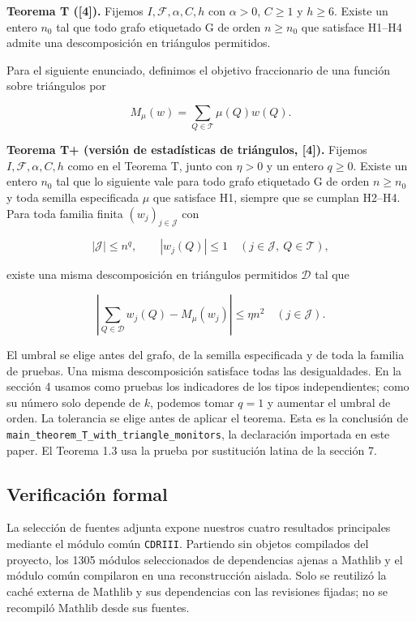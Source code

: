 \documentclass[spanish,11pt,a4paper]{article}
\begin{document}
\textbf{Teorema T ({[}4{]}).} Fijemos \(I,\mathcal F,\alpha,C,h\) con \(\alpha>0\), \(C\geq1\) y \(h\geq6\). Existe un entero \(n_0\) tal que todo grafo etiquetado G de orden \(n\geq n_0\) que satisface H1--H4 admite una descomposición en triángulos permitidos.

Para el siguiente enunciado, definimos el objetivo fraccionario de una función sobre triángulos por

\[M_\mu(w)=\sum_{Q\in\mathcal T}\mu(Q)w(Q).\]

\textbf{Teorema T+ (versión de estadísticas de triángulos, {[}4{]}).} Fijemos \(I,\mathcal F,\alpha,C,h\) como en el Teorema T, junto con \(\eta>0\) y un entero \(q\geq0\). Existe un entero \(n_0\) tal que lo siguiente vale para todo grafo etiquetado G de orden \(n\geq n_0\) y toda semilla especificada \(\mu\) que satisface H1, siempre que se cumplan H2--H4. Para toda familia finita \((w_j)_{j\in\mathcal J}\) con

\[|\mathcal J|\leq n^q,\qquad |w_j(Q)|\leq1\quad(j\in\mathcal J,\ Q\in\mathcal T),\]

existe una misma descomposición en triángulos permitidos \(\mathcal D\) tal que

\[\left|\sum_{Q\in\mathcal D}w_j(Q)-M_\mu(w_j)\right|\leq\eta n^2
\quad(j\in\mathcal J).\]

El umbral se elige antes del grafo, de la semilla especificada y de toda la familia de pruebas. Una misma descomposición satisface todas las desigualdades. En la sección 4 usamos como pruebas los indicadores de los tipos independientes; como su número solo depende de \(k\), podemos tomar \(q=1\) y aumentar el umbral de orden. La tolerancia se elige antes de aplicar el teorema. Esta es la conclusión de \texttt{main\_\allowbreak{}theorem\_\allowbreak{}T\_\allowbreak{}with\_\allowbreak{}triangle\_\allowbreak{}monitors}, la declaración importada en este paper. El Teorema 1.3 usa la prueba por sustitución latina de la sección 7.

\subsection{Verificación formal}\label{verificaciuxf3n-formal}

La selección de fuentes adjunta expone nuestros cuatro resultados principales mediante el módulo común \texttt{CDRIII}. Partiendo sin objetos compilados del proyecto, los 1305 módulos seleccionados de dependencias ajenas a Mathlib y el módulo común compilaron en una reconstrucción aislada. Solo se reutilizó la caché externa de Mathlib y sus dependencias con las revisiones fijadas; no se recompiló Mathlib desde sus fuentes.
\end{document}
